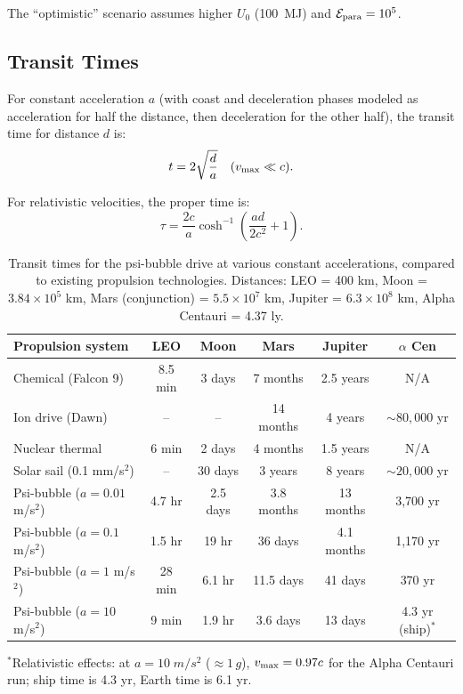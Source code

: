 \documentclass[twocolumn,prl,superscriptaddress,nofootinbib,longbibliography,floatfix]{revtex4-2}
\begin{document}
The ``optimistic'' scenario assumes higher $U_0$ (100~MJ) and
$\mathcal{E}_{\rm para} = 10^5$.

\subsection{Transit Times}

For constant acceleration $a$ (with coast and deceleration phases
modeled as acceleration for half the distance, then deceleration for
the other half), the transit time for distance $d$ is:
\begin{equation}
t = 2\sqrt{\frac{d}{a}} \quad (v_{\rm max} \ll c).
\label{eq:transit-nonrel}
\end{equation}

For relativistic velocities, the proper time is:
\begin{equation}
\tau = \frac{2c}{a}\cosh^{-1}\!\left(\frac{ad}{2c^2} + 1\right).
\label{eq:transit-rel}
\end{equation}

\begin{table}[t]
\centering
\caption{Transit times for the psi-bubble drive at various constant
accelerations, compared to existing propulsion technologies.
Distances: LEO = 400 km, Moon = $3.84 \times 10^5$ km,
Mars (conjunction) = $5.5 \times 10^7$ km,
Jupiter = $6.3 \times 10^8$ km,
Alpha Centauri = 4.37 ly.}
\label{tab:transit}
\begin{ruledtabular}
\begin{tabular}{lccccc}
Propulsion system & LEO & Moon & Mars & Jupiter &
$\alpha$ Cen \\
\hline
Chemical (Falcon 9) & 8.5 min & 3 days & 7 months & 2.5 years &
N/A \\
Ion drive (Dawn) & -- & -- & 14 months & 4 years &
$\sim 80{,}000$ yr \\
Nuclear thermal & 6 min & 2 days & 4 months & 1.5 years & N/A \\
Solar sail (0.1 mm/s$^2$) & -- & 30 days & 3 years & 8 years &
$\sim 20{,}000$ yr \\
\hline
Psi-bubble ($a = 0.01$ m/s$^2$) & 4.7 hr & 2.5 days & 3.8 months &
13 months & 3{,}700 yr \\
Psi-bubble ($a = 0.1$ m/s$^2$) & 1.5 hr & 19 hr & 36 days &
4.1 months & 1{,}170 yr \\
Psi-bubble ($a = 1$ m/s$^2$) & 28 min & 6.1 hr & 11.5 days &
41 days & 370 yr \\
Psi-bubble ($a = 10$ m/s$^2$) & 9 min & 1.9 hr & 3.6 days &
13 days & 4.3 yr (ship)$^*$ \\
\end{tabular}
\end{ruledtabular}
\begin{flushleft}
$^*$Relativistic effects: at $a = 10\;\si{m/s^2}$ ($\approx 1\,g$),
$v_{\rm max} = 0.97c$ for the Alpha Centauri run; ship time is 4.3 yr,
Earth time is 6.1 yr.
\end{flushleft}
\end{table}
\end{document}
